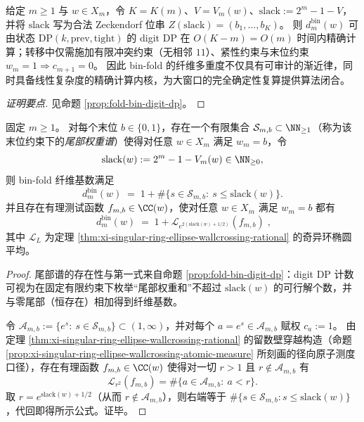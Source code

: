 \begin{conclusion}\label{con:xi-terminal-foldbin-digit-dp-linear-time}
给定 \(m\ge 1\) 与 \(w\in X_m\)，令 \(K=K(m)\)、\(V=V_m(w)\)、\(\mathrm{slack}:=2^m-1-V\)，并将 \(\mathrm{slack}\) 写为合法 Zeckendorf 位串 \(Z(\mathrm{slack})=(b_1,\dots,b_K)\)。
则 \(d_m^{\mathrm{bin}}(w)\) 可由状态
\(
\mathrm{DP}(k,\mathrm{prev},\mathrm{tight})
\)
的 digit DP 在 \(O(K-m)=O(m)\) 时间内精确计算；转移中仅需施加有限冲突约束（无相邻 \(11\)）、紧性约束与末位约束 \(w_m=1\Rightarrow c_{m+1}=0\)。
因此 bin-fold 的纤维多重度不仅具有可审计的渐近律，同时具备线性复杂度的精确计算内核，为大窗口的完全确定性复算提供算法闭合。
\end{conclusion}
\begin{proof}[证明要点]
见命题 \ref{prop:fold-bin-digit-dp}。
\end{proof}

\begin{proposition}[bin-fold 纤维计数的壁穿越表示：尾部谱 \texorpdfstring{$\Rightarrow$}{=>} 椭圆平均二值跳跃]\label{prop:xi-foldbin-fiber-wallcrossing-representation}
固定 \(m\ge 1\)。
对每个末位 \(b\in\{0,1\}\)，存在一个有限集合 \(\mathcal{S}_{m,b}\subset\NN_{\ge 1}\)（称为该末位约束下的\emph{尾部权重谱}）使得对任意 \(w\in X_m\) 满足 \(w_m=b\)，令
\[
\mathrm{slack}(w):=2^m-1-V_m(w)\in\NN_{\ge 0},
\]
则 bin-fold 纤维基数满足
\[
d_m^{\mathrm{bin}}(w)
\;=\;
1+\#\{s\in\mathcal{S}_{m,b}:\ s\le \mathrm{slack}(w)\}.
\]
并且存在有理测试函数 \(f_{m,b}\in\CC(w)\)，使对任意 \(w\in X_m\) 满足 \(w_m=b\) 都有
\[
\boxed{\;
d_m^{\mathrm{bin}}(w)
\;=\;
1+\mathcal{L}_{e^{2(\mathrm{slack}(w)+1/2)}}\!\left(f_{m,b}\right)\; },
\]
其中 \(\mathcal{L}_L\) 为定理 \ref{thm:xi-singular-ring-ellipse-wallcrossing-rational} 的奇异环椭圆平均。
\end{proposition}
\begin{proof}
尾部谱的存在性与第一式来自命题 \ref{prop:fold-bin-digit-dp}：digit DP 计数可视为在固定有限约束下枚举“尾部权重和”不超过 \(\mathrm{slack}(w)\) 的可行解个数，并与零尾部（恒存在）相加得到纤维基数。
\par
令 \(\mathcal{A}_{m,b}:=\{e^s:\ s\in\mathcal{S}_{m,b}\}\subset(1,\infty)\)，并对每个 \(a=e^s\in\mathcal{A}_{m,b}\) 赋权 \(c_a:=1\)。
由定理 \ref{thm:xi-singular-ring-ellipse-wallcrossing-rational} 的留数壁穿越构造（命题 \ref{prop:xi-singular-ring-ellipse-wallcrossing-atomic-measure} 所刻画的径向原子测度口径），存在有理函数 \(f_{m,b}\in\CC(w)\) 使得对一切 \(r>1\) 且 \(r\notin\mathcal{A}_{m,b}\) 有
\[
\mathcal{L}_{r^2}(f_{m,b})=\#\{a\in\mathcal{A}_{m,b}:\ a<r\}.
\]
取 \(r=e^{\mathrm{slack}(w)+1/2}\)（从而 \(r\notin \mathcal{A}_{m,b}\)），则右端等于 \(\#\{s\in\mathcal{S}_{m,b}: s\le \mathrm{slack}(w)\}\)，代回即得所示公式。证毕。
\end{proof}

